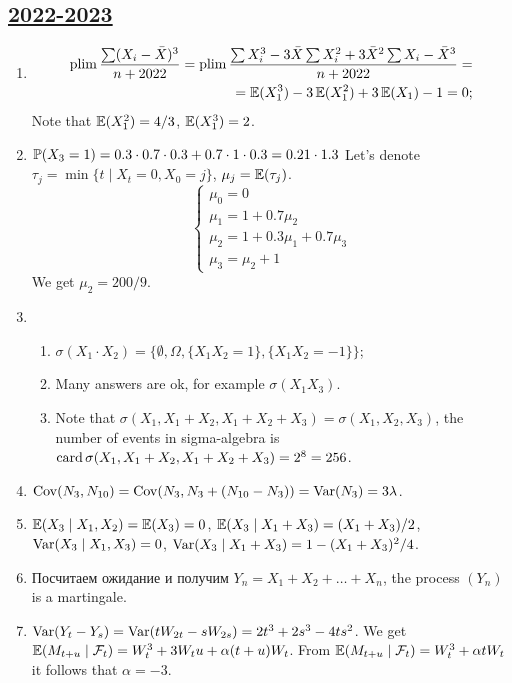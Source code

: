 \subsection[2022-2023]{\hyperref[sec:kr_01_2022_2023]{2022-2023}}
\label{sec:sol_kr_01_2022_2023} %

\begin{enumerate}
    \item 
    \begin{align*}
        \plim \frac{\sum (X_i - \bar X)^3}{n+2022} = \plim \frac{\sum X_i^3 - 3\bar X\sum X_i^2 +3\bar X^2 \sum X_i - \bar X^3}{n+2022} = \\
        = \E(X_1^3) - 3\E(X_1^2) + 3\E(X_1) - 1 = 0;
    \end{align*}
    Note that $\E(X_1^2) = 4/3$, $\E(X_1^3) = 2$.
    \item $\P(X_3 = 1) = 0.3\cdot 0.7\cdot 0.3 + 0.7\cdot 1\cdot 0.3 = 0.21 \cdot 1.3$
    Let's denote $\tau_j = \min \{t \mid X_t = 0, X_0 = j\}$, $\mu_j = \E(\tau_j)$.
    \[
    \begin{cases}
        \mu_0 = 0 \\
        \mu_1 = 1 + 0.7\mu_2 \\
        \mu_2 = 1 + 0.3\mu_1 + 0.7\mu_3 \\
        \mu_3 = \mu_2 + 1 
    \end{cases}    
    \]
    We get $\mu_2 = 200/9$.
    \item \begin{enumerate}
        \item $\sigma(X_1 \cdot X_2) = \{\emptyset, \Omega, \{X_1 X_2 = 1\}, \{X_1 X_2 = -1\}\}$;
        \item Many answers are ok, for example $\sigma(X_1 X_3)$.
        \item Note that $\sigma(X_1, X_1 + X_2, X_1+ X_2+X_3) = \sigma(X_1, X_2, X_3)$, the number of events in sigma-algebra is
        $\card \sigma(X_1, X_1 + X_2, X_1+ X_2+X_3) = 2^8 = 256$.
    \end{enumerate}
    \item $\Cov(N_3, N_{10}) = \Cov(N_3, N_3 + (N_{10} - N_3)) = \Var(N_3) = 3\lambda$.
    \item $\E(X_3 \mid X_1, X_2) = \E(X_3) = 0$, $\E(X_3 \mid X_1 + X_3) = (X_1 + X_3) / 2$, $\Var(X_3 \mid X_1, X_3) = 0$,
    $\Var(X_3 \mid X_1 + X_3) = 1 - (X_1 + X_3)^2/4$.
    \item Посчитаем ожидание и получим $Y_n = X_1 + X_2 + \ldots + X_n$, the process $(Y_n)$ is a martingale.
    \item $\Var(Y_t - Y_s) = \Var(tW_{2t} - sW_{2s}) = 2t^3 + 2s^3 - 4ts^2$.
    We get $\E(M_{t+u} \mid \mathcal F_t ) = W_t^3 + 3W_t u  + \alpha(t + u) W_t$.
    From $\E(M_{t+u} \mid \mathcal F_t ) = W_t^3 + \alpha t W_t$ it follows that $\alpha = -3$.
\end{enumerate}



